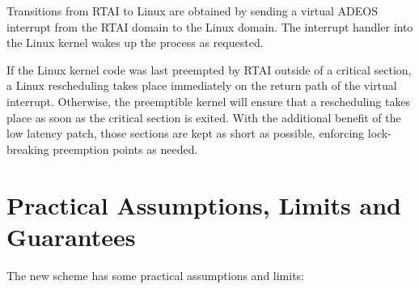 Transitions from RTAI to Linux are obtained by sending a
virtual ADEOS interrupt from the RTAI domain to the Linux
domain. The interrupt handler into the Linux kernel wakes up
the process as requested.

If the Linux kernel code was last preempted by RTAI outside
of a critical section, a Linux rescheduling takes place
immediately on the return path of the virtual
interrupt. Otherwise, the preemptible kernel will ensure that
a rescheduling takes place as soon as the critical section is
exited. With the additional benefit of the low latency patch,
those sections are kept as short as possible, enforcing
lock-breaking preemption points as needed.


\section{Practical Assumptions, Limits and Guarantees}

The new scheme has some practical assumptions and limits: 

